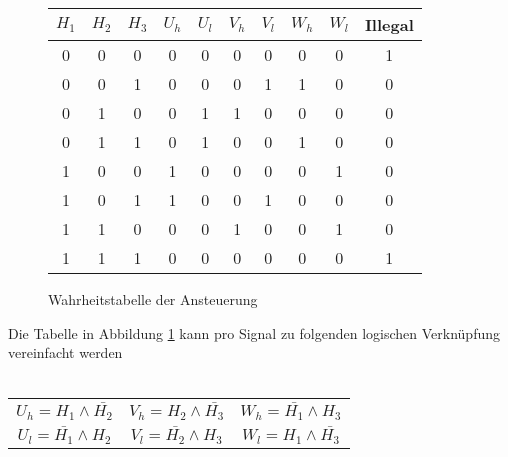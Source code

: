         \begin{figure}[h!]
            \begin{tabular}{ccc||cc|cc|cc||c}
                 $H_1$ & $H_2$ & $H_3$ & $U_h$ & $U_l$ & $V_h$ & $V_l$ & $W_h$ & $W_l$ & Illegal\\
            \hline 0   &   0   &   0   &   0   &   0   &   0   &   0   &   0   &   0   &   1\\
                   0   &   0   &   1   &   0   &   0   &   0   &   1   &   1   &   0   &   0\\
                   0   &   1   &   0   &   0   &   1   &   1   &   0   &   0   &   0   &   0\\
                   0   &   1   &   1   &   0   &   1   &   0   &   0   &   1   &   0   &   0\\
                   1   &   0   &   0   &   1   &   0   &   0   &   0   &   0   &   1   &   0\\
                   1   &   0   &   1   &   1   &   0   &   0   &   1   &   0   &   0   &   0\\
                   1   &   1   &   0   &   0   &   0   &   1   &   0   &   0   &   1   &   0\\
                   1   &   1   &   1   &   0   &   0   &   0   &   0   &   0   &   0   &   1\\
            \end{tabular}
           	\centering
           	\caption{Wahrheitstabelle der Ansteuerung} 
            \label{abb:WahrheitstabelleAnsteuerung}
        \end{figure}
        \parindent 0pt Die Tabelle in Abbildung 
        \ref{abb:WahrheitstabelleAnsteuerung} kann pro Signal zu folgenden 
        logischen Verknüpfung vereinfacht werden\\
        \\
        \begin{tabular}{ccc}
            $U_h = H_1 \wedge \bar{H_2}$ & $V_h = H_2 \wedge \bar{H_3}$ & $W_h = \bar{H_1} \wedge H_3$\\
            $U_l = \bar{H_1} \wedge H_2$ & $V_l = \bar{H_2} \wedge H_3$ & $W_l = H_1 \wedge \bar{H_3}$
        \end{tabular}
